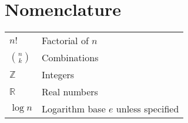 \section{Nomenclature}
\begin{tabular}{ll}
$n!$ & Factorial of $n$ \\
$\binom{n}{k}$ & Combinations \\
$\mathbb{Z}$ & Integers \\
$\mathbb{R}$ & Real numbers \\
$\log n$ & Logarithm base $e$ unless specified \\
\end{tabular}
